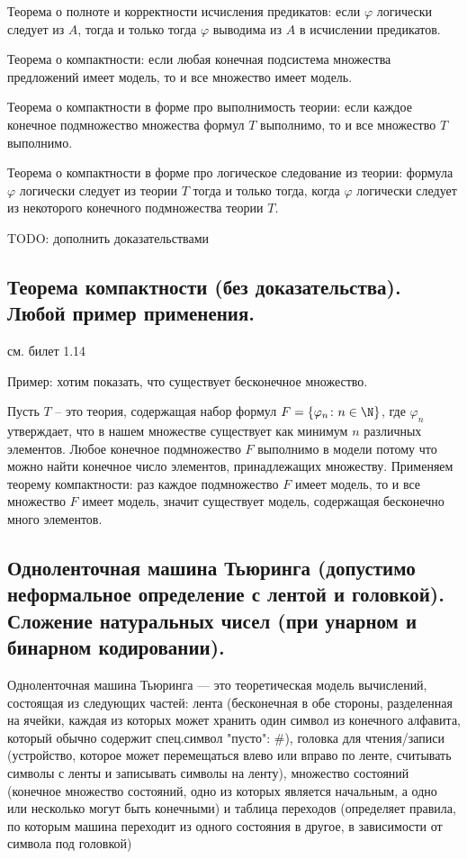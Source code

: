 \documentclass[a4paper, 10pt]{article}
\begin{document}
Теорема о полноте и корректности исчисления предикатов: если $\varphi$ логически следует из $A$, тогда и только тогда $\varphi$ выводима из $A$ в исчислении предикатов.

\hfill

Теорема о компактности: если любая конечная подсистема множества предложений имеет модель, то и все множество имеет модель.

Теорема о компактности в форме про выполнимость теории: если каждое конечное подмножество множества формул $T$ выполнимо, то и все множество $T$ выполнимо.

Теорема о компактности в форме про логическое следование из теории: формула $\varphi$ логически следует из теории $T$ тогда и только тогда, когда $\varphi$ логически следует из некоторого конечного подмножества теории $T$.

TODO: дополнить доказательствами

\subsection{Теорема компактности (без доказательства). Любой пример применения.}

см. билет 1.14

Пример: хотим показать, что существует бесконечное множество.

Пусть $T$ -- это теория, содержащая набор формул $F=\{\varphi_n \colon n \in \N\}$, где $\varphi_n$ утверждает, что в нашем множестве существует как минимум $n$ различных элементов. Любое конечное подмножество $F$ выполнимо в модели потому что можно найти конечное число элементов, принадлежащих множеству. Применяем теорему компактности: раз каждое подмножество $F$ имеет модель, то и все множество $F$ имеет модель, значит существует модель, содержащая бесконечно много элементов.

\subsection{Одноленточная машина Тьюринга (допустимо неформальное определение с лентой и головкой). Сложение натуральных чисел (при унарном и бинарном кодировании).}

Одноленточная машина Тьюринга — это теоретическая модель вычислений, состоящая из следующих частей: лента (бесконечная в обе стороны, разделенная на ячейки, каждая из которых может хранить один символ из конечного алфавита, который обычно содержит спец.символ "пусто": $\#$), головка для чтения/записи (устройство, которое может перемещаться влево или вправо по ленте, считывать символы с ленты и записывать символы на ленту), множество состояний (конечное множество состояний, одно из которых является начальным, а одно или несколько могут быть конечными) и таблица переходов (определяет правила, по которым машина переходит из одного состояния в другое, в зависимости от символа под головкой)
\end{document}
